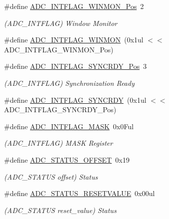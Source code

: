 \begin{DoxyCompactItemize}
\#define \mbox{\hyperlink{group___s_a_m_d21___a_d_c_gad83aca0d61282d0c0ac67d10028729d0}{A\+D\+C\+\_\+\+I\+N\+T\+F\+L\+A\+G\+\_\+\+W\+I\+N\+M\+O\+N\+\_\+\+Pos}}~2
\begin{DoxyCompactList}\small\item\em (A\+D\+C\+\_\+\+I\+N\+T\+F\+L\+AG) Window Monitor \end{DoxyCompactList}\item 
\#define \mbox{\hyperlink{group___s_a_m_d21___a_d_c_ga02cd4cf333a8a4d2e1c81fd4771896cf}{A\+D\+C\+\_\+\+I\+N\+T\+F\+L\+A\+G\+\_\+\+W\+I\+N\+M\+ON}}~(0x1ul $<$$<$ A\+D\+C\+\_\+\+I\+N\+T\+F\+L\+A\+G\+\_\+\+W\+I\+N\+M\+O\+N\+\_\+\+Pos)
\item 
\#define \mbox{\hyperlink{group___s_a_m_d21___a_d_c_ga0deaab0df076a92bb733b33738243dd3}{A\+D\+C\+\_\+\+I\+N\+T\+F\+L\+A\+G\+\_\+\+S\+Y\+N\+C\+R\+D\+Y\+\_\+\+Pos}}~3
\begin{DoxyCompactList}\small\item\em (A\+D\+C\+\_\+\+I\+N\+T\+F\+L\+AG) Synchronization Ready \end{DoxyCompactList}\item 
\#define \mbox{\hyperlink{group___s_a_m_d21___a_d_c_gabb67fec40de2a3576cab0a07180bc2bf}{A\+D\+C\+\_\+\+I\+N\+T\+F\+L\+A\+G\+\_\+\+S\+Y\+N\+C\+R\+DY}}~(0x1ul $<$$<$ A\+D\+C\+\_\+\+I\+N\+T\+F\+L\+A\+G\+\_\+\+S\+Y\+N\+C\+R\+D\+Y\+\_\+\+Pos)
\item 
\#define \mbox{\hyperlink{group___s_a_m_d21___a_d_c_gad6ae9e9e9b6b800afe5a4d69bb9fac91}{A\+D\+C\+\_\+\+I\+N\+T\+F\+L\+A\+G\+\_\+\+M\+A\+SK}}~0x0\+Ful
\begin{DoxyCompactList}\small\item\em (A\+D\+C\+\_\+\+I\+N\+T\+F\+L\+AG) M\+A\+SK Register \end{DoxyCompactList}\item 
\#define \mbox{\hyperlink{group___s_a_m_d21___a_d_c_ga92a9328e87712b738d626d0b9a6c5a22}{A\+D\+C\+\_\+\+S\+T\+A\+T\+U\+S\+\_\+\+O\+F\+F\+S\+ET}}~0x19
\begin{DoxyCompactList}\small\item\em (A\+D\+C\+\_\+\+S\+T\+A\+T\+US offset) Status \end{DoxyCompactList}\item 
\#define \mbox{\hyperlink{group___s_a_m_d21___a_d_c_gaf3b1f7a8d7a87c1dc328ef7b30109101}{A\+D\+C\+\_\+\+S\+T\+A\+T\+U\+S\+\_\+\+R\+E\+S\+E\+T\+V\+A\+L\+UE}}~0x00ul
\begin{DoxyCompactList}\small\item\em (A\+D\+C\+\_\+\+S\+T\+A\+T\+US reset\+\_\+value) Status \end{DoxyCompactList}\item 

\end{DoxyCompactItemize}
